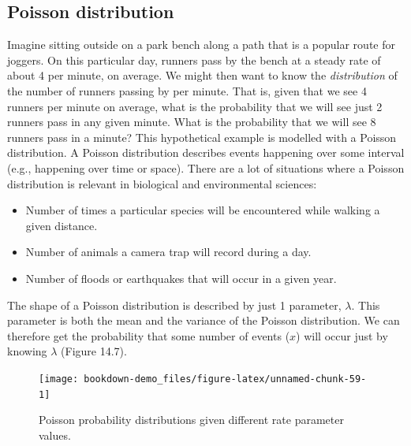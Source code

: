 \documentclass[
]{scrbook}
\providecommand{\tightlist}{%
  \setlength{\itemsep}{0pt}\setlength{\parskip}{0pt}}
\begin{document}
\hypertarget{poisson-distribution}{%
\subsection{Poisson distribution}\label{poisson-distribution}}

Imagine sitting outside on a park bench along a path that is a popular route for joggers.
On this particular day, runners pass by the bench at a steady rate of about 4 per minute, on average.
We might then want to know the \emph{distribution} of the number of runners passing by per minute.
That is, given that we see 4 runners per minute on average, what is the probability that we will see just 2 runners pass in any given minute.
What is the probability that we will see 8 runners pass in a minute?
This hypothetical example is modelled with a Poisson distribution.
A Poisson distribution describes events happening over some interval (e.g., happening over time or space).
There are a lot of situations where a Poisson distribution is relevant in biological and environmental sciences:

\begin{itemize}
\tightlist
\item
  Number of times a particular species will be encountered while walking a given distance.
\item
  Number of animals a camera trap will record during a day.
\item
  Number of floods or earthquakes that will occur in a given year.
\end{itemize}

The shape of a Poisson distribution is described by just 1 parameter, \(\lambda\).
This parameter is both the mean and the variance of the Poisson distribution.
We can therefore get the probability that some number of events (\(x\)) will occur just by knowing \(\lambda\) (Figure 14.7).

\begin{figure}
\texttt{[image: bookdown-demo\_files/figure-latex/unnamed-chunk-59-1]} \caption{Poisson probability distributions given different rate parameter values.}\label{fig:unnamed-chunk-59}
\end{figure}
\end{document}
